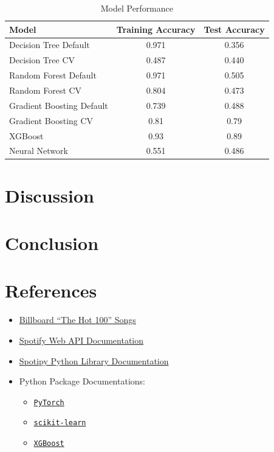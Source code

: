 \documentclass{article}
\begin{document}
\begin{table}[htbp]
    \centering
    \begin{tabular}{lcc}
        \toprule
        \textbf{Model} & \textbf{Training Accuracy} & \textbf{Test Accuracy} \\
        \midrule
        Decision Tree Default & 0.971 & 0.356 \\[3pt]
        Decision Tree CV & 0.487 & 0.440 \\[3pt]
        Random Forest Default & 0.971 & 0.505 \\[3pt]
        Random Forest CV & 0.804 & 0.473 \\[3pt]
        Gradient Boosting Default & 0.739 & 0.488 \\[3pt]
        Gradient Boosting CV & 0.81 & 0.79 \\[3pt]
        XGBoost & 0.93 & 0.89 \\[3pt]
        Neural Network & 0.551 & 0.486 \\
        \bottomrule
    \end{tabular}
    \caption{Model Performance}
    \label{tab:model_performance}
\end{table}

\section{Discussion}

\section{Conclusion}

\section{References}\label{sec:references}

\begin{itemize}
    \item \href{https://www.kaggle.com/datasets/dhruvildave/billboard-the-hot-100-songs}{Billboard ``The Hot 100'' Songs}
    \item \href{https://developer.spotify.com/documentation/web-api}{Spotify Web API Documentation}
    \item \href{https://spotipy.readthedocs.io/en/2.22.1/}{Spotipy Python Library Documentation}
    \item Python Package Documentations:
    \begin{itemize}
        \item \href{https://pytorch.org/docs/stable/torch.html}{\texttt{PyTorch}}
        \item \href{https://scikit-learn.org/stable/index.html}{\texttt{scikit-learn}}
        \item \href{https://xgboost.readthedocs.io/en/stable/python/python_intro.html}{\texttt{XGBoost}}
    \end{itemize}
\end{itemize}
\end{document}
